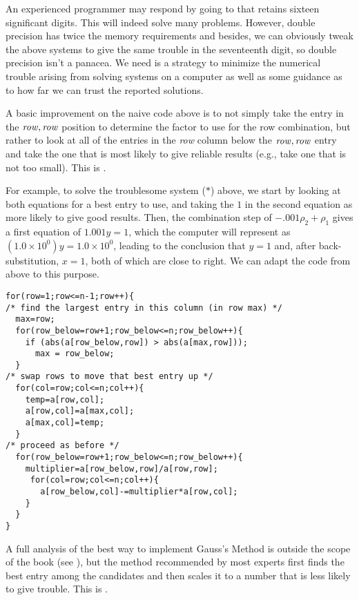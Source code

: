 An experienced programmer may respond by going to
that retains sixteen significant digits.
This will indeed solve many problems.
However, double precision has twice
the memory requirements
and besides, we can obviously tweak the above systems to give the
same trouble in the seventeenth digit, so double precision
isn't a panacea.
We need is a strategy to minimize the numerical
trouble arising from solving systems on a computer
as well as some guidance as to how far we can trust the reported 
solutions. 

A basic improvement on the naive code above 
is to not simply take the entry
in the $\text{\textit{row}},\text{\textit{row}}$
position to determine the factor to use for the row combination,
but rather to look at all of the entries in the \textit{row}
column below the $\text{\textit{row}},\text{\textit{row}}$ entry
and take the one that is most likely to give reliable results
(e.g., take one that is not too small).
This is .%

For example, to solve the troublesome system ($*$) above,
we start by looking at both equations for a best entry to use, 
and taking the $1$ in
the second equation as more likely to give good results.
Then, the combination step of $-.001\rho_2+\rho_1$ gives a first equation of 
$1.001y=1$, which the computer will represent as 
$(1.0\times 10^{0})y=1.0\times 10^{0}$, leading to the conclusion that 
$y=1$ and, after back-substitution, $x=1$, 
both of which are close to right.  
We can adapt the code from above to this purpose.
\begin{lstlisting}
for(row=1;row<=n-1;row++){
/* find the largest entry in this column (in row max) */
  max=row;
  for(row_below=row+1;row_below<=n;row_below++){
    if (abs(a[row_below,row]) > abs(a[max,row]));
      max = row_below;
  }
/* swap rows to move that best entry up */
  for(col=row;col<=n;col++){
    temp=a[row,col];
    a[row,col]=a[max,col];
    a[max,col]=temp;
  }
/* proceed as before */
  for(row_below=row+1;row_below<=n;row_below++){
    multiplier=a[row_below,row]/a[row,row];
     for(col=row;col<=n;col++){
       a[row_below,col]-=multiplier*a[row,col];
    }
  }
}
\end{lstlisting}

A full analysis of the best way to implement Gauss's Method 
is outside the scope of the book (see \cite{Wilkinson65}),
but the method recommended by most experts 
first finds the best entry
among the candidates and then scales it to a number that is less
likely to give trouble.
This is 
.

